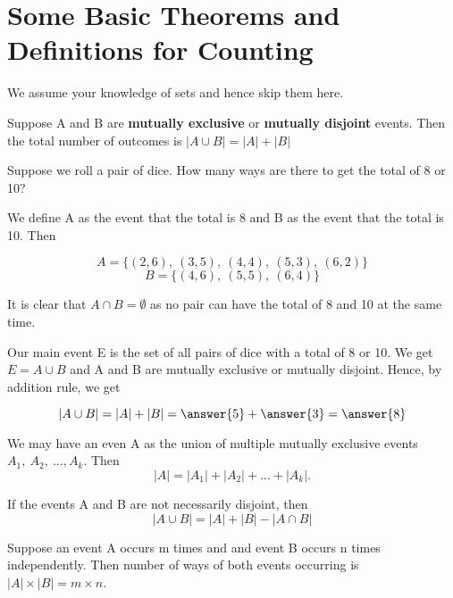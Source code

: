\documentclass{ximera}
\begin{document}
\hspace{1cm}


\section*{Some Basic Theorems and Definitions for Counting}

We assume your knowledge of sets and hence skip them here.

\begin{theorem}
Suppose A and B are \textbf{mutually exclusive} or \textbf{mutually disjoint}  events. Then the total number of outcomes is $|A\cup B|=|A|+|B|$
\end{theorem}

\begin{example}
Suppose we roll a pair of dice. How many ways are there to get the total of 8 or 10?

\begin{explanation}
We define A as the event that the total is 8 and B as the event that the total is 10. Then 

$$A=\{(2,6),~(3,5),~(4,4),~(5,3),~(6,2)\}$$
$$B=\{(4,6),~(5,5),~(6,4)\}$$

It is clear that $A\cap B=\emptyset$ as no pair can have the total of 8 and 10 at the same time.

Our main event E is the set of all pairs of dice with a total of 8 or 10. We get $E=A\cup B$ and A and B are mutually exclusive or mutually disjoint. Hence, by addition rule, we get

$$|A\cup B|=|A|+|B|=\answer{5}+\answer{3}=\answer{8}$$
\end{explanation}

\begin{remark}
We may have an even A as the union of multiple mutually exclusive events $A_1,~ A_2, ~\ldots, A_k$. Then 
$$|A|=|A_1|+|A_2|+\ldots+|A_k|.$$
\end{remark}

\begin{remark}
If the events A and B are not necessarily disjoint, then 
$$|A\cup B|=|A|+|B|-|A\cap B|$$
\end{remark}
\end{example}


\begin{theorem}
Suppose an event A occurs m times and and event B occurs n times independently. Then number of ways of both events occurring is $|A|\times |B|=m\times n$.
\end{theorem}
\end{document}
